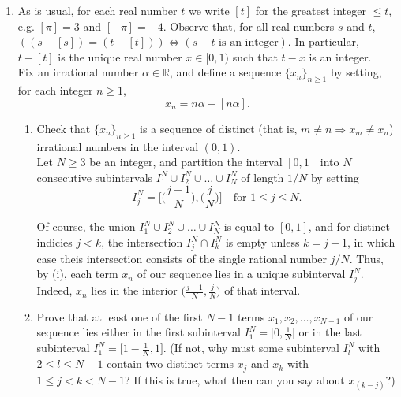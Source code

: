 \documentclass[11pt]{article}
\begin{document}
\begin{enumerate}[leftmargin=0pt, label=\arabic*)]
 \item As is usual, for each real number \(t\) we write \([t]\) for the greatest integer \(\leq t\), e.g. 
 \([\pi] = 3\) and \([-\pi] = -4\).  Observe that, for all real numbers \(s\) and \(t\), 
 \(((s - [s]) = (t - [t])) \Leftrightarrow (s - t \text{ is an integer})\).  In particular, \(t - [t]\) is 
 the unique real number \(x \in [0,1)\) such that \(t-x\) is an integer. \\

 Fix an irrational number \(\alpha \in \mathbb{R}\), and define a sequence \(\{x_n\}_{n \geq 1}\) by 
 setting, for each integer \(n \geq 1\), 
 \[x_n = n\alpha - [n\alpha].\]

 \begin{enumerate}[label=(\roman*)]
   \item Check that \(\{x_n\}_{n \geq 1}\) is a sequence of distinct (that is, \(m \neq n \Rightarrow 
     x_m \neq x_n\)) irrational numbers in the interval \((0,1)\). \\

     Let \(N \geq 3\) be an integer, and partition the interval \([0,1]\) into \(N\) consecutive subintervals
     \(I_1^N \cup I_2^N \cup \dots \cup I_N^N\) of length \(1/N\) by setting
     \[I_j^N = \bigg[\Big(\frac{j-1}{N}\Big), \Big(\frac{j}{N}\Big) \bigg] \quad \text{for } 1 \leq j \leq N.\]

     Of course, the union \(I_1^N \cup I_2^N \cup \dots \cup I_N^N\) is equal to \([0,1]\), and for distinct 
     indicies \(j < k\), the intersection \(I_j^N \cap I_k^N\) is empty unless \(k = j+1\), in which case 
     theis intersection consists of the single rational number \(j/N\).  Thus, by (i), each term \(x_n\) of 
     our sequence lies in a unique subinterval \(I_j^N\).  Indeed, \(x_n\) lies in the interior 
     \(\Big(\frac{j-1}{N}, \frac{j}{N}\Big)\) of that interval.

     
   \item Prove that at least one of the first \(N-1\) terms \(x_1, x_2, \dots, x_{N-1}\) of our sequence 
     lies either in the first subinterval \(I_1^N = \Big[0,\frac{1}{N}\Big]\) or in the last subinterval 
     \(I_1^N = \Big[1-\frac{1}{N},1\Big]\). (If not, why must some subinterval \(I_l^N\) with
     \(2 \leq l \leq N-1\) contain two distinct terms \(x_j\) and \(x_k\) with \(1 \leq j < k < N-1\)? 
     If this is true, what then can you say about \(x_{(k-j)}\)?)


\end{enumerate}
\end{enumerate}
\end{document}
